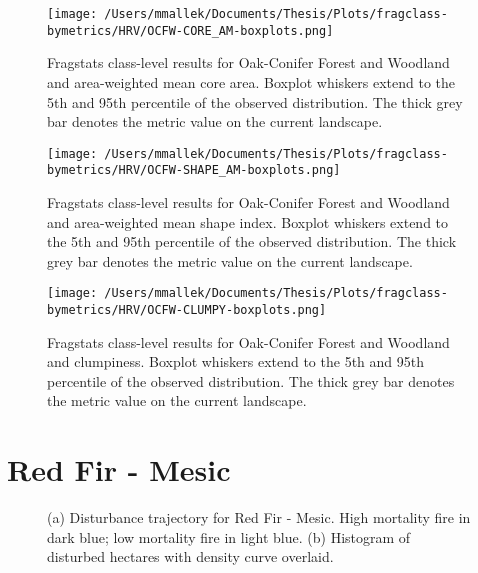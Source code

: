 \begin{figure}[!htbp]
\centering
    \texttt{[image: /Users/mmallek/Documents/Thesis/Plots/fragclass-bymetrics/HRV/OCFW-CORE\_AM-boxplots.png]}
  \caption{Fragstats class-level results for Oak-Conifer Forest and Woodland and area-weighted mean core area. Boxplot whiskers extend to the 5th and 95th percentile of the observed distribution. The thick grey bar denotes the metric value on the current landscape.}
  \label{fig:ocfw_coream}
\end{figure}


\begin{figure}[!htbp]
\centering
    \texttt{[image: /Users/mmallek/Documents/Thesis/Plots/fragclass-bymetrics/HRV/OCFW-SHAPE\_AM-boxplots.png]}
  \caption{Fragstats class-level results for Oak-Conifer Forest and Woodland and area-weighted mean shape index. Boxplot whiskers extend to the 5th and 95th percentile of the observed distribution. The thick grey bar denotes the metric value on the current landscape.}
  \label{fig:ocfw_shapeam}
\end{figure}


\begin{figure}[!htbp]
\centering
    \texttt{[image: /Users/mmallek/Documents/Thesis/Plots/fragclass-bymetrics/HRV/OCFW-CLUMPY-boxplots.png]}
  \caption{Fragstats class-level results for Oak-Conifer Forest and Woodland and clumpiness. Boxplot whiskers extend to the 5th and 95th percentile of the observed distribution. The thick grey bar denotes the metric value on the current landscape.}
  \label{fig:ocfw_clumpy}
\end{figure}



\clearpage
\section{Red Fir - Mesic} 
\begin{figure}[!htbp]
  \centering
  \caption{\small (a) Disturbance trajectory for Red Fir - Mesic. High mortality fire in dark blue; low mortality fire in light blue. (b) Histogram of disturbed hectares with density curve overlaid.} 
  \label{fig:darea_rfrm}
\end{figure}

